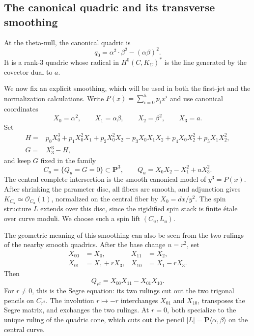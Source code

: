 \documentclass[10pt,a4paper]{amsart}
\newcommand{\OO}{\mathcal O}
\begin{document}
\subsection{The canonical quadric and its transverse smoothing}
\label{subsec:quadric-smoothing}

At the theta-null, the canonical quadric is
\begin{equation}
\label{eq:q0-cyclic}
q_0
=
\alpha^2\cdot\beta^2-(\alpha\beta)^2.
\end{equation}
\begingroup
It is a rank-$3$ quadric whose radical in $H^0(C,K_C)^*$ is the line
generated by the covector dual to $a$.

We now fix an explicit smoothing, which will be used in both the
first-jet and the normalization calculations. Write
$P(x)=\sum_{i=0}^5p_ix^i$ and use canonical coordinates
\[
X_0=\alpha^2,\qquad X_1=\alpha\beta,\qquad
X_2=\beta^2,\qquad X_3=a.
\]
Set
\begin{equation}
\label{eq:fixed-homogeneous-cubic}
\begin{aligned}
H={}&p_0X_0^3+p_1X_0^2X_1+p_2X_0^2X_2
      +p_3X_0X_1X_2 +p_4X_0X_2^2+p_5X_1X_2^2, \\
G={}&X_3^3-H,
\end{aligned}
\end{equation}
and keep $G$ fixed in the family
\begin{equation}
\label{eq:explicit-Q-u}
C_u=\{Q_u=G=0\}\subset\mathbf P^3,
\qquad Q_u=X_0X_2-X_1^2+uX_3^2.
\end{equation}
The central complete intersection is the smooth canonical model of
$y^3=P(x)$. After shrinking the parameter disc, all fibers are smooth,
and adjunction gives $K_{C_u}\simeq\OO_{C_u}(1)$, normalized on the
central fiber by $X_0=dx/y^2$. The spin structure $L$ extends over
this disc, since the rigidified spin stack is finite \'etale over
curve moduli. We choose such a spin lift $(C_u,L_u)$.

\begingroup
The geometric meaning of this smoothing can also be seen from the
two rulings of the nearby smooth quadrics. After the base change
$u=r^2$, set
\begin{align*}
X_{00}&=X_0,
&
X_{11}&=X_2,
\\
X_{01}&=X_1+rX_3,
&
X_{10}&=X_1-rX_3.
\end{align*}
Then
\[
Q_{r^2}=X_{00}X_{11}-X_{01}X_{10}.
\]
For $r\neq0$, this is the Segre equation: its two rulings cut out
the two trigonal pencils on $C_{r^2}$. The involution $r\mapsto-r$
interchanges $X_{01}$ and $X_{10}$, transposes the Segre matrix,
and exchanges the two rulings. At $r=0$, both specialize to the
unique ruling of the quadric cone, which cuts out the pencil
$|L|=\mathbf P\langle\alpha,\beta\rangle$ on the central curve.
\end{document}
